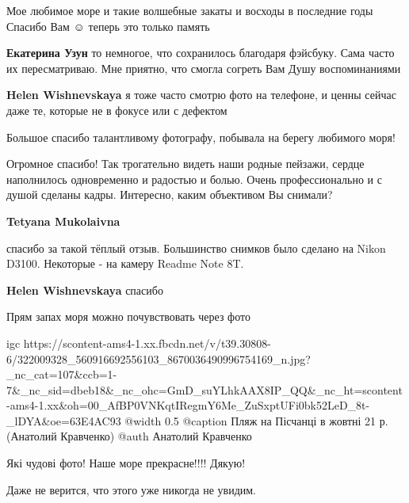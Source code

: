 
Мое любимое море и такие волшебные закаты и восходы в последние годы 🤩 Спасибо
Вам ☺️ теперь это только память 🥺

\begin{itemize} %
\textbf{Екатерина Узун} то немногое, что сохранилось благодаря фэйсбуку. Сама часто их пересматриваю. Мне приятно, что смогла согреть Вам Душу воспоминаниями

\textbf{Helen Wishnevskaya} я тоже часто смотрю фото на телефоне, и ценны сейчас даже те, которые не в фокусе или с дефектом
\end{itemize} %


Большое спасибо талантливому фотографу, побывала на берегу любимого моря!


Огромное спасибо! Так трогательно видеть наши родные пейзажи, сердце
наполнилось одновременно и радостью и болью. Очень профессионально и с душой
сделаны кадры. Интересно, каким объективом Вы снимали?

\begin{itemize} %
\textbf{Tetyana Mukolaivna} 

спасибо за такой тёплый отзыв. Большинство снимков было сделано на Nikon D3100.
Некоторые - на камеру Readme Note 8T.

\textbf{Helen Wishnevskaya} спасибо
\end{itemize} %


Прям запах моря можно почувствовать через фото


\ifcmt
  igc https://scontent-ams4-1.xx.fbcdn.net/v/t39.30808-6/322009328_560916692556103_8670036490996754169_n.jpg?_nc_cat=107&ccb=1-7&_nc_sid=dbeb18&_nc_ohc=GmD_suYLhkAAX8IP_QQ&_nc_ht=scontent-ams4-1.xx&oh=00_AfBP0VNKqtIRegmY6Me_ZuSxptUFi0bk52LeD_8t-_lDYA&oe=63E4AC93
  @width 0.5
  @caption Пляж на Пісчанці в жовтні 21 р. (Анатолий Кравченко)
  @auth Анатолий Кравченко
\fi


Які чудові фото! Наше море прекрасне!!!! Дякую!


Даже не верится, что этого уже никогда не увидим.

